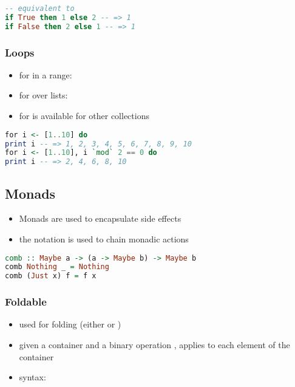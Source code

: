 \documentclass[a4paper,landscape,10pt]{article}
\begin{document}
\begin{multicols*}{2}
\begin{lstlisting}[language=Haskell]
-- equivalent to
if True then 1 else 2 -- => 1
if False then 2 else 1 -- => 1
\end{lstlisting}

  \subsubsection{Loops}

  \begin{itemize}
    \item for in a range: 
    \item for over lists: 
    \item for is available for other collections
  \end{itemize}

  \begin{lstlisting}[language=Haskell]
for i <- [1..10] do
print i -- => 1, 2, 3, 4, 5, 6, 7, 8, 9, 10
for i <- [1..10], i `mod` 2 == 0 do
print i -- => 2, 4, 6, 8, 10
\end{lstlisting}

  \breakcolumn

  \subsection{Monads}

  \begin{itemize}
    \item Monads are used to encapsulate side effects
    \item the  notation is used to chain monadic actions
  \end{itemize}

  \begin{lstlisting}[language=Haskell]
comb :: Maybe a -> (a -> Maybe b) -> Maybe b
comb Nothing _ = Nothing
comb (Just x) f = f x
\end{lstlisting}

  \subsubsection{Foldable}

  \begin{itemize}
    \item used for folding (either  or )
    \item given a container and a binary operation , applies  to each element of the container
    \item syntax: 
  \end{itemize}


\end{multicols*}
\end{document}
